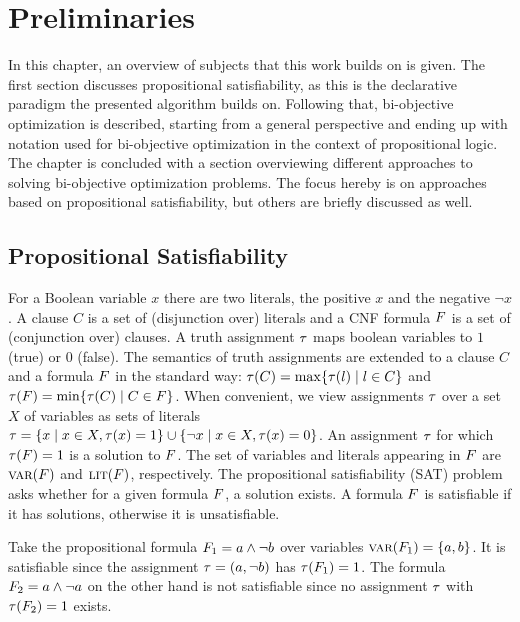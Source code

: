 \chapter{Preliminaries\label{chap:preliminaries}}

In this chapter, an overview of subjects that this work builds on is given.
The first section discusses propositional satisfiability, as this is the declarative paradigm the presented algorithm builds on.
Following that, bi-objective optimization is described, starting from a general perspective and ending up with notation used for bi-objective optimization in the context of propositional logic.
The chapter is concluded with a section overviewing different approaches to solving bi-objective optimization problems.
The focus hereby is on approaches based on propositional satisfiability, but others are briefly discussed as well.

\section{Propositional Satisfiability\label{sec:sat}}

For a Boolean variable $x$ there are two literals, the positive $x$ and the negative $\lnot x$. 
A clause $C$ is a set of (disjunction over) literals and a CNF formula $F$ is a set of (conjunction over) clauses.
A truth assignment $\tau$ maps boolean variables to $1$ (true) or $0$ (false).
The semantics of truth assignments are extended to a clause $C$ and a formula $F$ in the standard way: $\tau(C) = \max\{ \tau(l) \mid l \in C\}$ and $\tau(F) = \min\{\tau(C) \mid C \in F\}$.
When convenient, we view assignments $\tau$ over a set $X$ of variables as sets of literals $\tau = \{ x \mid x \in X,  \tau(x) = 1\} \cup \{ \lnot x \mid x \in X, \tau(x) = 0\}$.
An assignment $\tau$ for which $\tau(F) = 1$ is a solution to $F$.
The set of variables and literals appearing in $F$ are $\textsc{var}(F)$ and $\textsc{lit}(F)$, respectively.  
The propositional satisfiability (SAT) problem asks whether for a given formula $F$, a solution exists.
A formula $F$ is satisfiable if it has solutions, otherwise it is unsatisfiable.
\begin{example}
  Take the propositional formula $F_1 = a \land \lnot b$ over variables $\textsc{var}(F_1) = \{a,b\}$.
  It is satisfiable since the assignment $\tau=(a,\lnot b)$ has $\tau(F_1)=1$.
  The formula $F_2 = a \land \lnot a$ on the other hand is not satisfiable since no assignment $\tau$ with $\tau(F_2)=1$ exists.
\end{example}

